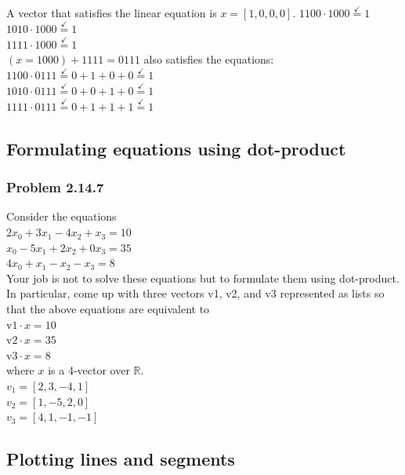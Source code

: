 \documentclass[
  letterpaper,
  DIV=11,
  numbers=noendperiod]{scrartcl}
\begin{document}
A vector that satisfies the linear equation is \(x = [1, 0, 0, 0]\).
\(1100 \cdot 1000 \stackrel{\checkmark}{=} 1\)\\
\(1010 \cdot 1000 \stackrel{\checkmark}{=} 1\)\\
\(1111 \cdot 1000 \stackrel{\checkmark}{=} 1\)\\
\((x=1000)+1111 = 0111\) also satisfies the equations:\\
\(1100 \cdot 0111 \stackrel{\checkmark}{=} 0 + 1 + 0 + 0 \stackrel{\checkmark}{=} 1\)\\
\(1010 \cdot 0111 \stackrel{\checkmark}{=} 0 + 0 + 1 + 0 \stackrel{\checkmark}{=} 1\)\\
\(1111 \cdot 0111 \stackrel{\checkmark}{=} 0 + 1 + 1 + 1 \stackrel{\checkmark}{=} 1\)

\hypertarget{formulating-equations-using-dot-product}{%
\subsection{Formulating equations using
dot-product}\label{formulating-equations-using-dot-product}}

\hypertarget{problem-2.14.7}{%
\subsubsection{Problem 2.14.7}\label{problem-2.14.7}}

Consider the equations\\
\(2x_0 + 3x_1 - 4x_2 + x_3 = 10\)\\
\(x_0 - 5x_1 + 2x_2 + 0x_3 = 35\)\\
\(4x_0 + x_1 - x_2 - x_3 = 8\)\\
Your job is not to solve these equations but to formulate them using
dot-product. In particular, come up with three vectors v1, v2, and v3
represented as lists so that the above equations are equivalent to\\
\(\mathrm{v1} \cdot x = 10\)\\
\(\mathrm{v2} \cdot x = 35\)\\
\(\mathrm{v3} \cdot x = 8\)\\
where \(x\) is a 4-vector over \(\mathbb{R}\).\\
\(v_1=[2, 3, -4, 1]\)\\
\(v_2=[1, -5, 2, 0]\)\\
\(v_3=[4, 1, -1, -1]\)

\hypertarget{plotting-lines-and-segments}{%
\subsection{Plotting lines and
segments}\label{plotting-lines-and-segments}}
\end{document}

